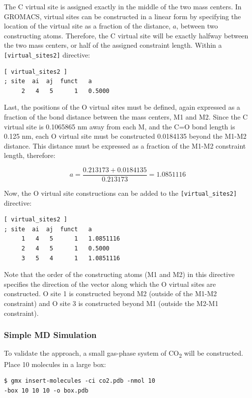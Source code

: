 \documentclass[9pt,tutorial]{livecoms}
\begin{document}
The C virtual site is assigned exactly in the middle of the two mass centers. In GROMACS, virtual sites can be constructed in a linear form by specifying the location of the virtual site as a fraction of the distance, $a$, between two constructing atoms. Therefore, the C virtual site will be exactly halfway between the two mass centers, or half of the assigned constraint length. Within a \texttt{[virtual\_sites2]} directive: 

\begin{verbatim}
[ virtual_sites2 ]
; site  ai  aj  funct   a
     2   4   5      1   0.5000
\end{verbatim}

Last, the positions of the O virtual sites must be defined, again expressed as a fraction of the bond distance between the mass centers, M1 and M2. Since the C virtual site is 0.1065865 nm away from each M, and the C=O bond length is 0.125 nm, each O virtual site must be constructed 0.0184135 beyond the M1-M2 distance. This distance must be expressed as a fraction of the M1-M2 constraint length, therefore:

\begin{equation}
a = \frac{0.213173+0.0184135}{0.213173} = 1.0851116
\end{equation}

Now, the O virtual site constructions can be added to the \texttt{[virtual\_sites2]} directive:

\begin{verbatim}
[ virtual_sites2 ]
; site  ai  aj  funct   a
     1   4   5      1   1.0851116
     2   4   5      1   0.5000 
     3   5   4      1   1.0851116
\end{verbatim}

Note that the order of the constructing atoms (M1 and M2) in this directive specifies the direction of the vector along which the O virtual sites are constructed. O site 1 is constructed beyond M2 (outside of the M1-M2 constraint) and O site 3 is constructed beyond M1 (outside the M2-M1 constraint).

\subsubsection{Simple MD Simulation} \label{vsite_md}

To validate the approach, a small gas-phase system of CO\textsubscript{2} will be constructed. Place 10 molecules in a large box:

\begin{verbatim}
$ gmx insert-molecules -ci co2.pdb -nmol 10 
-box 10 10 10 -o box.pdb
\end{verbatim}
\end{document}
